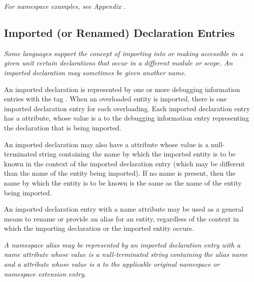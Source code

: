 \textit{For  namespace examples, 
see Appendix .}


\subsection{Imported (or Renamed) Declaration Entries} 
\label{chap:importedorrenameddeclarationentries}

\textit{Some languages support the concept of importing into or 
making accessible in a given unit certain declarations that occur
in a different module or scope. An imported declaration may 
sometimes be given another name.}

An imported declaration is represented by one or
more debugging information entries with the 
tag \DWTAGimporteddeclarationTARG. 
When\hypertarget{chap:DWATimportimporteddeclaration}{}
an overloaded entity is imported, there is one imported 
declaration entry for each overloading. 
Each imported declaration entry has a
\DWATimportDEFN{} attribute,
whose value is a  to the
debugging information entry representing the declaration that
is being imported.

An imported declaration may also have a \DWATname{}
attribute
whose value is a null-terminated string containing the
name by which the
imported entity is to be known in the context of the imported
declaration entry (which may be different than the name of
the entity being imported). If no name is present, then the
name by which the entity is to be known is the same as the
name of the entity being imported.

An imported declaration entry with a name attribute may be
used as a general means to rename or provide an alias for
an entity, regardless of the context in which the importing
declaration or the imported entity occurs.

\textit{A 
namespace alias\hypertarget{chap:DWATimportnamespacealias}{} 
may be represented by an imported declaration entry 
with a name attribute whose value is
a null-terminated string containing the alias name
and a \DWATimportDEFN{} attribute 
whose value is a  to the 
applicable original namespace or namespace extension entry.}

